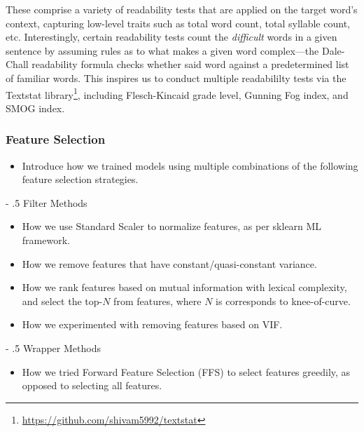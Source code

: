 \documentclass[11pt,a4paper]{article}
\makeatletter
\renewcommand\paragraph{%
    \@startsection{paragraph}{4}{0mm}%
        {-\baselineskip}%
        {.5\baselineskip}%
        {\normalfont\normalsize\bfseries}}
\makeatother
\begin{document}
These comprise a variety of readability tests that are applied on the target word's context, capturing low-level traits such as total word count, total syllable count, etc. Interestingly, certain readability tests count the \textit{difficult} words in a given sentence by assuming rules as to what makes a given word complex—the Dale-Chall readability formula \citep{10.2307/1473669} checks whether said word against a predetermined list of familiar words. This inspires us to conduct multiple readabililty tests via the Textstat library\footnote{\url{https://github.com/shivam5992/textstat}}, including Flesch-Kincaid grade level, Gunning Fog index, and SMOG index.

\subsubsection{Feature Selection}

\begin{itemize}
  \item Introduce how we trained models using multiple combinations of the following feature selection strategies.
\end{itemize}

\paragraph{Filter Methods}

\begin{itemize}
  \item How we use Standard Scaler to normalize features, as per sklearn ML framework.
  \item How we remove features that have constant/quasi-constant variance.
  \item How we rank features based on mutual information with lexical complexity, and select the top-$N$ from features, where $N$ is corresponds to knee-of-curve.
  \item How we experimented with removing features based on VIF.
\end{itemize}

\paragraph{Wrapper Methods}

\begin{itemize}
  \item How we tried Forward Feature Selection (FFS) to select features greedily, as opposed to selecting all features.
\end{itemize}
\end{document}
